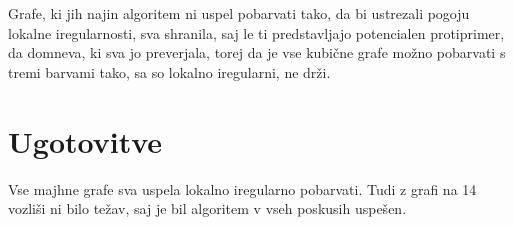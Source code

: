 \documentclass[12pt, a4paper]{article}
\begin{document}
Grafe, ki jih najin algoritem ni uspel pobarvati tako, da bi ustrezali pogoju lokalne iregularnosti, sva shranila, saj le ti predstavljajo potencialen protiprimer, da domneva, ki sva jo preverjala, torej da je vse kubične grafe možno pobarvati s tremi barvami tako, sa so lokalno iregularni, ne drži.

\newpage
\section{Ugotovitve}
Vse majhne grafe sva uspela lokalno iregularno pobarvati. Tudi z grafi na 14 vozliši ni bilo težav, saj je bil algoritem v vseh poskusih uspešen.
\end{document}
